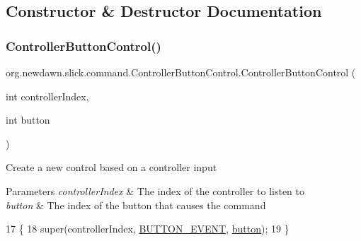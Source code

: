 \subsection{Constructor \& Destructor Documentation}
\mbox{\label{classorg_1_1newdawn_1_1slick_1_1command_1_1_controller_button_control_aec92ab43b38eb977f61e2774a51f2e0e}} 
\subsubsection{\texorpdfstring{Controller\+Button\+Control()}{ControllerButtonControl()}}
{\footnotesize\ttfamily org.\+newdawn.\+slick.\+command.\+Controller\+Button\+Control.\+Controller\+Button\+Control (\begin{DoxyParamCaption}\item[{int}]{controller\+Index,  }\item[{int}]{button }\end{DoxyParamCaption})\hspace{0.3cm}{\ttfamily [inline]}}

Create a new control based on a controller input


\begin{DoxyParams}{Parameters}
{\em controller\+Index} & The index of the controller to listen to \\
\hline
{\em button} & The index of the button that causes the command \\
\hline
\end{DoxyParams}

\begin{DoxyCode}
17                                                                     \{
18         super(controllerIndex, \mbox{\hyperlink{classorg_1_1newdawn_1_1slick_1_1command_1_1_controller_control_a0e2e21a7d85dd11ac52ce6bba40e3260}{BUTTON\_EVENT}}, \mbox{\hyperlink{classorg_1_1newdawn_1_1slick_1_1command_1_1_controller_control_ad8d48f8cc2889d5360de6dc2202203f4}{button}});
19     \}
\end{DoxyCode}
